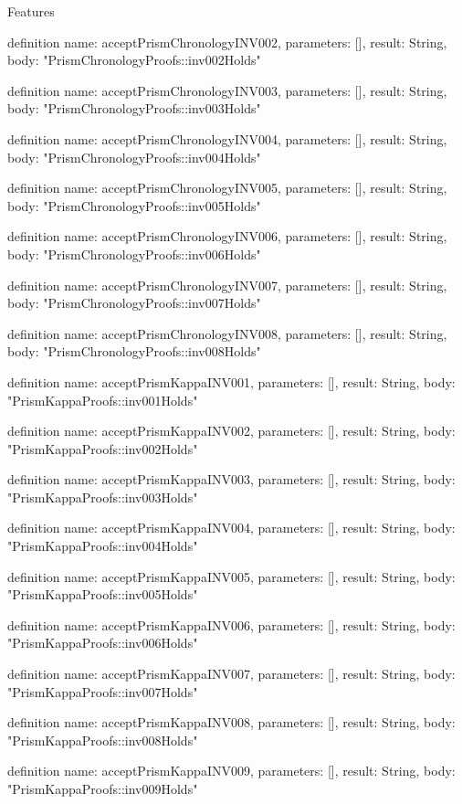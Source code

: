 \begin{lexlean}{Features}
\begin{semanticmodule}
definition{
  name: acceptPrismChronologyINV002,
  parameters: [],
  result: String,
  body: "PrismChronologyProofs::inv002Holds"
}

definition{
  name: acceptPrismChronologyINV003,
  parameters: [],
  result: String,
  body: "PrismChronologyProofs::inv003Holds"
}

definition{
  name: acceptPrismChronologyINV004,
  parameters: [],
  result: String,
  body: "PrismChronologyProofs::inv004Holds"
}

definition{
  name: acceptPrismChronologyINV005,
  parameters: [],
  result: String,
  body: "PrismChronologyProofs::inv005Holds"
}

definition{
  name: acceptPrismChronologyINV006,
  parameters: [],
  result: String,
  body: "PrismChronologyProofs::inv006Holds"
}

definition{
  name: acceptPrismChronologyINV007,
  parameters: [],
  result: String,
  body: "PrismChronologyProofs::inv007Holds"
}

definition{
  name: acceptPrismChronologyINV008,
  parameters: [],
  result: String,
  body: "PrismChronologyProofs::inv008Holds"
}

definition{
  name: acceptPrismKappaINV001,
  parameters: [],
  result: String,
  body: "PrismKappaProofs::inv001Holds"
}

definition{
  name: acceptPrismKappaINV002,
  parameters: [],
  result: String,
  body: "PrismKappaProofs::inv002Holds"
}

definition{
  name: acceptPrismKappaINV003,
  parameters: [],
  result: String,
  body: "PrismKappaProofs::inv003Holds"
}

definition{
  name: acceptPrismKappaINV004,
  parameters: [],
  result: String,
  body: "PrismKappaProofs::inv004Holds"
}

definition{
  name: acceptPrismKappaINV005,
  parameters: [],
  result: String,
  body: "PrismKappaProofs::inv005Holds"
}

definition{
  name: acceptPrismKappaINV006,
  parameters: [],
  result: String,
  body: "PrismKappaProofs::inv006Holds"
}

definition{
  name: acceptPrismKappaINV007,
  parameters: [],
  result: String,
  body: "PrismKappaProofs::inv007Holds"
}

definition{
  name: acceptPrismKappaINV008,
  parameters: [],
  result: String,
  body: "PrismKappaProofs::inv008Holds"
}

definition{
  name: acceptPrismKappaINV009,
  parameters: [],
  result: String,
  body: "PrismKappaProofs::inv009Holds"
}


\end{semanticmodule}
\end{lexlean}
